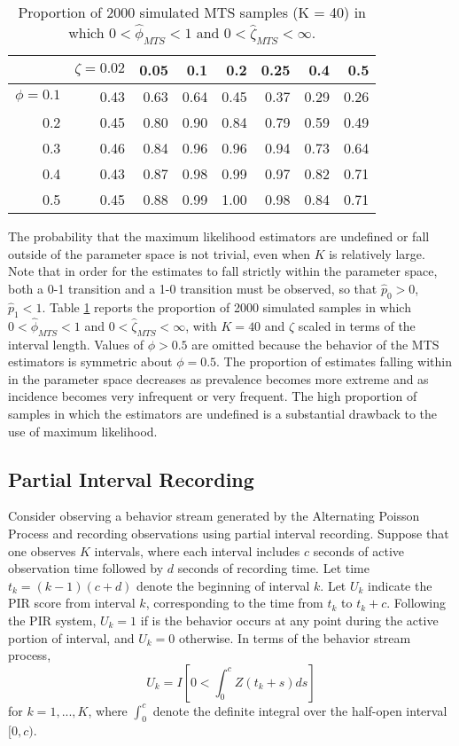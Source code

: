 \documentclass[man, noextraspace, floatsintext]{apa6}\usepackage[]{graphicx}\usepackage[]{color}
\begin{document}
\begin{table}[b]
\centering
\caption{Proportion of 2000 simulated MTS samples (K = 40) in which $0 < \hat\phi_{MTS} < 1$ and $0 < \hat\zeta_{MTS} < \infty$.} 
\label{tab:MTS_zeta_valid}
\begin{tabular}{rrrrrrrr}
  \hline
 & $\zeta = 0.02$ & 0.05 & 0.1 & 0.2 & 0.25 & 0.4 & 0.5 \\ 
  \hline
$\phi = 0.1$ & 0.43 & 0.63 & 0.64 & 0.45 & 0.37 & 0.29 & 0.26 \\ 
  0.2 & 0.45 & 0.80 & 0.90 & 0.84 & 0.79 & 0.59 & 0.49 \\ 
  0.3 & 0.46 & 0.84 & 0.96 & 0.96 & 0.94 & 0.73 & 0.64 \\ 
  0.4 & 0.43 & 0.87 & 0.98 & 0.99 & 0.97 & 0.82 & 0.71 \\ 
  0.5 & 0.45 & 0.88 & 0.99 & 1.00 & 0.98 & 0.84 & 0.71 \\ 
   \hline
\end{tabular}
\end{table}


The probability that the maximum likelihood estimators are undefined or fall outside of the parameter space is not trivial, even when $K$ is relatively large. Note that in order for the estimates to fall strictly within the parameter space, both a 0-1 transition and a 1-0 transition must be observed, so that $\hat{p}_0 > 0$, $\hat{p}_1 < 1$. Table \ref{tab:MTS_zeta_valid} reports the proportion of 2000 simulated samples in which $0 < \hat\phi_{MTS} < 1$ and $0 < \hat\zeta_{MTS} < \infty$, with $K = 40$ and $\zeta$ scaled in terms of the interval length. Values of $\phi > 0.5$ are omitted because the behavior of the MTS estimators is symmetric about $\phi = 0.5$. The proportion of estimates falling within in the parameter space decreases as prevalence becomes more extreme and as incidence becomes very infrequent or very frequent. The high proportion of samples in which the estimators are undefined is a substantial drawback to the use of maximum likelihood.

\subsection{Partial Interval Recording}
\label{subsec:PIR}

Consider observing a behavior stream generated by the Alternating Poisson Process and recording observations using partial interval recording. Suppose that one observes $K$ intervals, where each interval includes $c$ seconds of active observation time followed by $d$ seconds of recording time. Let time $t_k = (k-1)(c + d)$ denote the beginning of interval $k$. Let $U_k$ indicate the PIR score from interval $k$, corresponding to the time from $t_k$ to $t_k + c$. Following the PIR system, $U_k = 1$ if is the behavior occurs at any point during the active portion of interval, and $U_k = 0$ otherwise. In terms of the behavior stream process, 
\begin{equation}
U_k = I\left[ 0 < \int_0^c Z\left(t_k + s \right) ds\right]
\end{equation}
for $k = 1,...,K$, where $\int_0^c$ denote the definite integral over the half-open interval $[0,c)$.
\end{document}
